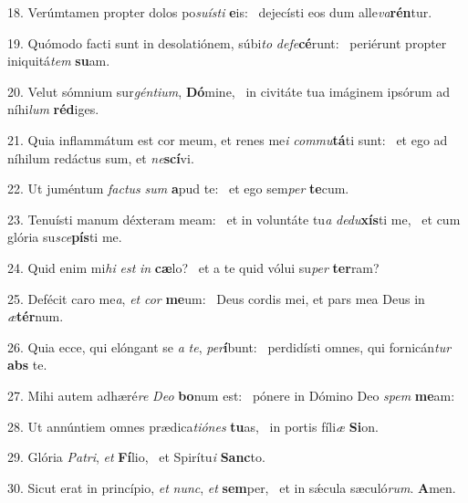 18. Verúmtamen propter dolos po\textit{su}\textit{ís}\textit{ti} \textbf{e}is: \ast\  dejecísti eos dum alle\textit{va}\textbf{rén}tur.\

19. Quómodo facti sunt in desolatiónem, súbi\textit{to} \textit{de}\textit{fe}\textbf{cé}runt: \ast\  periérunt propter iniquitá\textit{tem} \textbf{su}am.\

20. Velut sómnium sur\textit{gén}\textit{ti}\textit{um}, \textbf{Dó}mine, \ast\  in civitáte tua imáginem ipsórum ad níhi\textit{lum} \textbf{réd}iges.\

21. Quia inflammátum est cor meum, et renes me\textit{i} \textit{com}\textit{mu}\textbf{tá}ti sunt: \ast\  et ego ad níhilum redáctus sum, et \textit{ne}\textbf{scí}vi.\

22. Ut juméntum \textit{fac}\textit{tus} \textit{sum} \textbf{a}pud te: \ast\  et ego sem\textit{per} \textbf{te}cum.\

23. Tenuísti manum déxteram meam: \dag\  et in voluntáte tu\textit{a} \textit{de}\textit{du}\textbf{xís}ti me, \ast\  et cum glória su\textit{sce}\textbf{pís}ti me.\

24. Quid enim mi\textit{hi} \textit{est} \textit{in} \textbf{cæ}lo? \ast\  et a te quid vólui su\textit{per} \textbf{ter}ram?\

25. Defécit caro me\textit{a}, \textit{et} \textit{cor} \textbf{me}um: \ast\  Deus cordis mei, et pars mea Deus in \textit{æ}\textbf{tér}num.\

26. Quia ecce, qui elóngant se \textit{a} \textit{te}, \textit{per}\textbf{í}bunt: \ast\  perdidísti omnes, qui fornicán\textit{tur} \textbf{abs} te.\

27. Mihi autem adhæré\textit{re} \textit{De}\textit{o} \textbf{bo}num est: \ast\  pónere in Dómino Deo \textit{spem} \textbf{me}am:\

28. Ut annúntiem omnes prædica\textit{ti}\textit{ó}\textit{nes} \textbf{tu}as, \ast\  in portis fíli\textit{æ} \textbf{Si}on.\

29. Glória \textit{Pa}\textit{tri}, \textit{et} \textbf{Fí}lio, \ast\  et Spirítu\textit{i} \textbf{Sanc}to.\

30. Sicut erat in princípio, \textit{et} \textit{nunc}, \textit{et} \textbf{sem}per, \ast\  et in sǽcula sæculó\textit{rum}. \textbf{A}men.\

